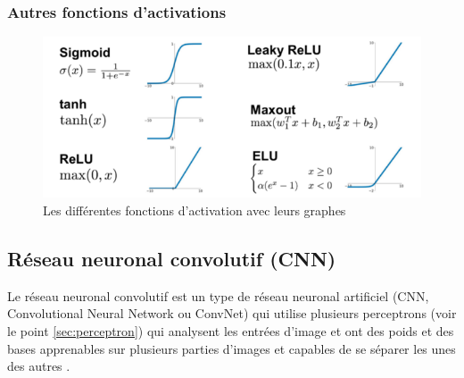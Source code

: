 	
	
	\subsubsection{Autres fonctions d'activations}
	
	\begin{figure}[H]%
		\centering
		\includegraphics[width=12cm]{images/activation_functions.png}
		\caption{Les différentes fonctions d'activation avec leurs graphes}
		\label{fig:all_activation_function}
	\end{figure}
	
	
	
	\subsection{Réseau neuronal convolutif (CNN)}\label{sec:cnn}
	
	Le réseau neuronal convolutif est un type de réseau neuronal artificiel (CNN, Convolutional Neural Network ou ConvNet) qui utilise plusieurs perceptrons (voir le point \ref{sec:perceptron}) qui analysent les entrées d'image et ont des poids et des bases apprenables sur plusieurs parties d'images et capables de se séparer les unes des autres \cite{tammina2019transfer}.
	
